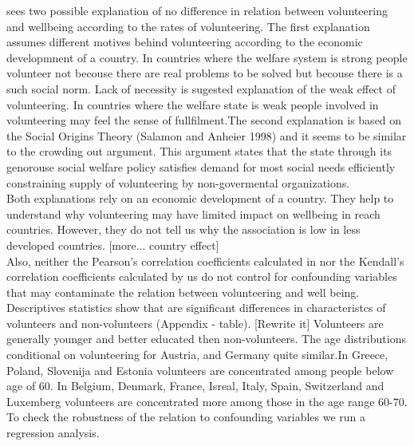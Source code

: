 \documentclass[10pt, letterpaper]{article}
\begin{document}
\begin{spacing}{1.4}
\citet{haski09} sees two possible explanation of no difference in relation between volunteering and wellbeing according to the rates of volunteering. The first explanation assumes different motives behind volunteering according to the economic developmnent of a country. In countries where the welfare system is strong people volunteer not becouse there are real problems to be solved but becouse there is a such social norm. Lack of necessity is sugested explanation of the weak effect of volunteering.  In countries where the welfare state is weak people involved in volunteering may feel the sense of fullfilment.The second explanation is based on the Social Origins Theory (Salamon and Anheier 1998) and it seems to be similar to the crowding out argument. This argument states that the state through its genorouse social welfare policy satisfies demand for most social needs efficiently constraining supply of volunteering by non-govermental organizations.  \\

Both explanations rely on an economic development of a country. They help to understand why volunteering may have limited impact on wellbeing in reach countries. However, they do not tell us why the association is low in less developed countries. [more... country effect] \\

Also, neither the Pearson's correlation coefficients calculated in \citet{haski09}  nor the Kendall's correlation coefficients calculated by us do not control for confounding variables that may contaminate the relation between volunteering and well being. Descriptives statistics show that are significant differences in characteristcs of volunteers and non-volunteers (Appendix - table). [Rewrite it] Volunteers are generally younger and better educated then non-volunteers. The age distributions conditional on volunteering for Austria, and Germany quite similar.In Greece, Poland, Slovenija and Estonia volunteers are concentrated among people below age of 60. In Belgium, Denmark, France, Isreal, Italy, Spain, Switzerland and Luxemberg volunteers are concentrated more among those in the age range 60-70.  To check the robustness of the relation to confounding variables we run a regression analysis.   






\end{spacing}
\end{document}
